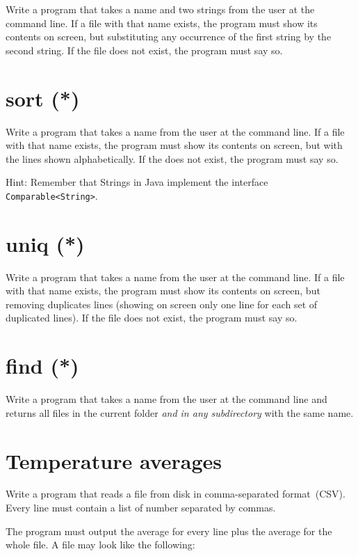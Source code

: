 \documentclass{article}
\begin{document}
Write a program that takes a name and two strings from the user at the
command line. If a file with that name exists, the program must show
its contents on screen, but substituting any occurrence of the first
string by the second string. If the file does not exist, the program
must say so.

\section{sort (*)}
\label{sec:sort-}

Write a program that takes a name from the user at the command
line. If a file with that name exists, the program must show its
contents on screen, but with the lines shown alphabetically. If the
does not exist, the program must say so. 

Hint: Remember that Strings in Java implement the interface
\verb+Comparable<String>+. 

\section{uniq (*)}
\label{sec:uniq-}

Write a program that takes a name from the user at the command
line. If a file with that name exists, the program must show its
contents on screen, but removing duplicates lines (showing on screen 
only one line for each set of duplicated lines). If the file
does not exist, the program must say so. 

\section{find (*)}
\label{sec:find-}

Write a program that takes a name from the user at the command
line and returns all files in the current folder \emph{and in any
subdirectory} with the same name. 


\section{Temperature averages}
\label{sec:temperature-averages}

Write a program that reads a file from disk in comma-separated
format~(CSV). Every line must contain a list of number separated by
commas. 

The program must output the average for every line plus the average
for the whole file. A file may look like the following: 
\end{document}
